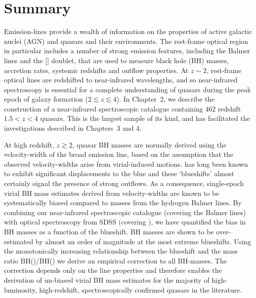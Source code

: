 \begingroup
\let\clearpage\relax
\let\cleardoublepage\relax
\let\cleardoublepage\relax

\chapter*{Summary}

Emission-lines provide a wealth of information on the properties of active galactic nuclei (AGN) and quasars and their environments. 
The rest-frame optical region in particular includes a number of strong emission features, including the Balmer lines and the [] doublet, that are used to measure black hole (BH) masses, accretion rates, systemic redshifts and outflow properties. 
At $z\sim2$, rest-frame optical lines are redshifted to near-infrared wavelengths, and so near-infrared spectroscopy is essential for a complete understanding of quasars during the peak epoch of galaxy formation ($2 \lesssim z \lesssim 4$). 
In Chapter~2, we describe the construction of a near-infrared spectroscopic catalogue containing $462$ redshift $1.5 < z < 4$ quasars. 
This is the largest sample of its kind, and has facilitated the investigations described in Chapters~3 and 4.   

At high redshift, $z \gtrsim 2$, quasar BH masses are normally derived using the velocity-width of the  broad emission line, based on the assumption that the observed velocity-widths arise from virial-induced motions.  
 has long been known to exhibit significant displacements to the blue and these `blueshifts' almost certainly signal the presence of strong outflows.
As a consequence, single-epoch virial BH mass estimates derived from  velocity-widths are known to be systematically biased compared to masses from the hydrogen Balmer lines.
By combining our near-infrared spectroscopic catalogue (covering the Balmer lines) with optical spectroscopy from SDSS (covering ), we have quantified the bias in  BH masses as a function of the  blueshift. 
 BH masses are shown to be over-estimated by almost an order of magnitude at the most extreme blueshifts.
Using the monotonically increasing relationship between the  blueshift and the mass ratio BH()/BH(\hans) we derive an empirical correction to all  BH-masses.
The correction depends only on the  line properties and therefore enables the derivation of un-biased virial BH mass estimates for the majority of high-luminosity, high-redshift, spectroscopically confirmed quasars in the literature. 

